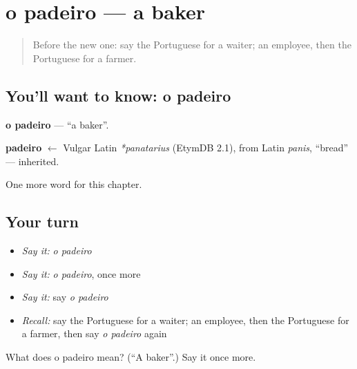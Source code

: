 \section[o padeiro]{o padeiro — a baker}

\label{lesson:PT-C110-padeiro}



\begin{quote}
Before the new one: say the Portuguese for a waiter; an employee, then the Portuguese for a farmer.
\end{quote}

\subsection*{You'll want to know: o padeiro}
\textbf{o padeiro} — \textquotedblleft{}a baker\textquotedblright{}.

\begin{cousinweb}
\textbf{padeiro} $\leftarrow$ Vulgar Latin \emph{*panatarius} (EtymDB 2.1), from Latin \emph{panis}, \textquotedblleft{}bread\textquotedblright{} — inherited.
\end{cousinweb}

\begin{grammarlens}[title={What you've built}]
One more word for this chapter.
\end{grammarlens}

\subsection*{Your turn}
\begin{itemize}
\raggedright
  \item \emph{Say it:} \emph{o padeiro}
  \item \emph{Say it:} \emph{o padeiro}, once more
  \item \emph{Say it:} say \emph{o padeiro}
  \item \emph{Recall:} say the Portuguese for a waiter; an employee, then the Portuguese for a farmer, then say \emph{o padeiro} again
\end{itemize}

\begin{tcolorbox}[breakable,colback=teal!4,colframe=teal!35!black,title={Before you move on}]
What does o padeiro mean? (\textquotedblleft{}A baker\textquotedblright{}.) Say it once more.
\end{tcolorbox}
